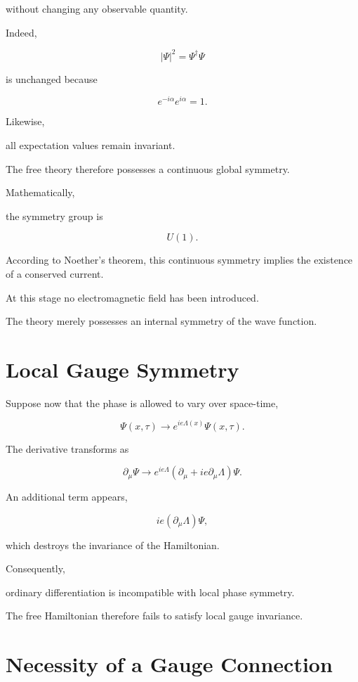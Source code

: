 without changing any observable quantity.

Indeed,

\[
|\Psi|^2
=
\Psi^\dagger\Psi
\]

is unchanged because

\[
e^{-i\alpha}e^{i\alpha}=1.
\]

Likewise,

all expectation values remain invariant.

The free theory therefore possesses a continuous global symmetry.

Mathematically,

the symmetry group is

\[
U(1).
\]

According to Noether's theorem,
this continuous symmetry implies the existence of a conserved current.

At this stage no electromagnetic field has been introduced.

The theory merely possesses an internal symmetry of the wave function.


\section{Local Gauge Symmetry}

Suppose now that the phase is allowed to vary over space-time,

\[
\boxed{
\Psi(x,\tau)
\rightarrow
e^{ie\Lambda(x)}
\Psi(x,\tau).
}
\]

The derivative transforms as

\[
\partial_\mu\Psi
\rightarrow
e^{ie\Lambda}
\left(
\partial_\mu
+
ie\partial_\mu\Lambda
\right)
\Psi.
\]

An additional term appears,

\[
ie(\partial_\mu\Lambda)\Psi,
\]

which destroys the invariance of the Hamiltonian.

Consequently,

ordinary differentiation is incompatible with local phase symmetry.

The free Hamiltonian therefore fails to satisfy local gauge invariance.


\section{Necessity of a Gauge Connection}

